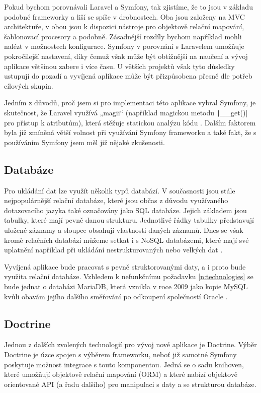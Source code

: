 Pokud bychom porovnávali Laravel a Symfony, tak zjistíme, že to jsou v základu podobné frameworky a liší se spíše v drobnostech. Oba jsou založeny na MVC architektuře, v obou jsou k dispozici nástroje pro objektově relační mapování, šablonovací procesory a podobně. Zásadnější rozdíly bychom například mohli nalézt v možnostech konfigurace. Symfony v porovnání s Laravelem umožňuje pokročilejší nastavení, díky čemuž však může být obtížnější na naučení a vývoj aplikace většinou zabere i více času. U větších projektů však tyto důsledky ustupují do pozadí a vyvíjená aplikace může být přizpůsobena přesně dle potřeb cílových skupin. \cite{symfony_laravel_comparison}

Jedním z důvodů, proč jsem si pro implementaci této aplikace vybral Symfony, je skutečnost, že Laravel využívá „magii“ (například magickou metodu \texttt|__get()| pro přístup k atributům), která stěžuje statickou analýzu kódu \cite{larastan}. Dalším faktorem byla již zmíněná větší volnost při využívání Symfony frameworku a také fakt, že s používáním Symfony jsem měl již nějaké zkušenosti.

\subsection{Databáze}
Pro ukládání dat lze využít několik typů databází. V současnosti jsou stále nejpopulárnější relační databáze, které jsou občas z důvodu využívaného dotazovacího jazyka také označovány jako SQL databáze. Jejich základem jsou tabulky, které mají pevně danou strukturu. Jednotlivé řádky tabulky  představují uložené záznamy a sloupce obsahují vlastnosti daných záznamů. \cite{databases} Dnes se však kromě relačních databází můžeme setkat i s NoSQL databázemi, které mají své uplatnění například při ukládání nestrukturovaných nebo velkých dat \cite{nosql}.

Vyvíjená aplikace bude pracovat s pevně struktorovanými daty, a i proto bude využita relační databáze. Vzhledem k nefunkčnímu požadavku \ref{n:technologies} se bude jednat o databázi MariaDB, která vznikla v roce 2009 jako kopie MySQL kvůli obavám jejího dalšího směřování po odkoupení společností Oracle \cite{mariadb}.

\subsection{Doctrine}
Jednou z dalších zvolených technologií pro vývoj nové aplikace je Doctrine. Výběr Doctrine je úzce spojen s výběrem frameworku, neboť již samotné Symfony poskytuje možnost integrace s touto komponentou. Jedná se o sadu knihoven, které umožňují objektově relační mapování (ORM) a které nabízí objektově orientované API (a řadu dalšího) pro manipulaci s daty a se strukturou databáze. \cite{doctrine_orm, doctrine_dbal}

